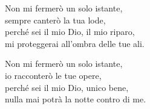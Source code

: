 
 

\spazio

\strofa Non mi fermerò un solo istante,\\
sempre canterò la tua lode,\\
perché sei il mio Dio, il mio riparo,\\
mi proteggerai all'ombra delle tue ali.

\spazio


\spazio

\strofa Non mi fermerò un solo istante,\\
io racconterò le tue opere,\\
perché sei il mio Dio, unico bene,\\
nulla mai potrà la notte contro di me.

\spazio

